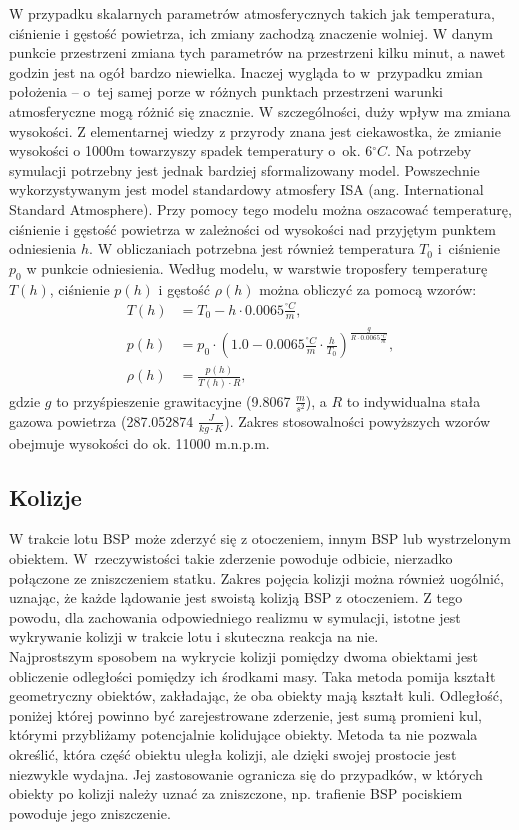 W przypadku skalarnych parametrów atmosferycznych takich jak temperatura, ciśnienie i gęstość powietrza, ich zmiany zachodzą znaczenie wolniej. W danym punkcie przestrzeni zmiana tych parametrów na przestrzeni kilku minut, a nawet godzin jest na ogół bardzo niewielka. Inaczej wygląda to w~przypadku zmian położenia -- o~tej samej porze w różnych punktach przestrzeni warunki atmosferyczne mogą różnić się znacznie. W szczególności, duży wpływ ma zmiana wysokości. Z elementarnej wiedzy z przyrody znana jest ciekawostka, że zmianie wysokości o 1000m towarzyszy spadek temperatury o~ok. 6$^{\circ}C$. Na potrzeby symulacji potrzebny jest jednak bardziej sformalizowany model. Powszechnie wykorzystywanym jest model standardowy atmosfery ISA (ang. International Standard Atmosphere). Przy pomocy tego modelu można oszacować temperaturę, ciśnienie i gęstość powietrza w zależności od wysokości nad przyjętym punktem odniesienia $h$. W obliczaniach potrzebna jest również temperatura $T_0$ i~ciśnienie $p_0$ w punkcie odniesienia. Według modelu, w warstwie troposfery temperaturę $T(h)$, ciśnienie $p(h)$ i gęstość $\rho(h)$ można obliczyć za pomocą wzorów:
\[
	\begin{aligned}
	T(h) & = T_0 - h \cdot 0.0065 \frac{^\circ C}{m},\\
	p(h) & = p_0 \cdot \left(1.0 - 0.0065 \frac{^\circ C}{m} \cdot \frac{h}{T_0} \right)^{\frac{g}{R \cdot  0.0065 \frac{^\circ C}{m}}},\\
	\rho(h) &  = \frac{p(h)}{T(h) \cdot R},
	\end{aligned}
\]
gdzie $g$ to przyśpieszenie grawitacyjne (9.8067 $\frac{m}{s^2}$), a $R$ to indywidualna stała gazowa powietrza (287.052874  $\frac{J}{kg \cdot K}$). Zakres stosowalności powyższych wzorów obejmuje wysokości do ok. 11000 m.n.p.m.

\subsection{Kolizje}

W trakcie lotu BSP może zderzyć się z otoczeniem, innym BSP lub wystrzelonym obiektem. W~rzeczywistości takie zderzenie powoduje odbicie, nierzadko połączone ze zniszczeniem statku. Zakres pojęcia kolizji można również uogólnić, uznając, że każde lądowanie jest swoistą kolizją BSP z otoczeniem. Z tego powodu, dla zachowania odpowiedniego realizmu w symulacji, istotne jest wykrywanie kolizji w trakcie lotu i skuteczna reakcja na nie.\\

Najprostszym sposobem na wykrycie kolizji pomiędzy dwoma obiektami jest obliczenie odległości pomiędzy ich środkami masy. Taka metoda pomija kształt geometryczny obiektów, zakładając, że oba obiekty mają kształt kuli. Odległość, poniżej której powinno być zarejestrowane zderzenie, jest sumą promieni kul, którymi przybliżamy potencjalnie kolidujące obiekty. Metoda ta nie pozwala określić, która część obiektu uległa kolizji, ale dzięki swojej prostocie jest niezwykle wydajna. Jej zastosowanie ogranicza się do przypadków, w których obiekty po kolizji należy uznać za zniszczone, np. trafienie BSP pociskiem powoduje jego zniszczenie.\\

